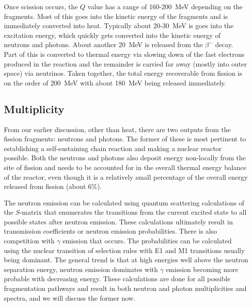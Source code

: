 Once scission occurs, the $Q$ value has a range of 160-200~MeV depending on the fragments. Most of this goes into the kinetic energy of the fragments and is immediately converted into heat. Typically about 20-30~MeV is goes into the excitation energy, which quickly gets converted into the kinetic energy of neutrons and photons. About another 20~MeV is released from the $\beta^-$ decay. Part of this is converted to thermal energy via slowing down of the fast electrons produced in the reaction and the remainder is carried far away (mostly into outer space) via neutrinos. Taken together, the total energy recoverable from fission is on the order of 200~MeV with about 180~MeV being released immediately.

\subsection{Multiplicity}

From our earlier discussion, other than heat, there are two outputs from the fission fragments: neutrons and photons. The former of these is most pertinent to establishing a self-sustaining chain reaction and making a nuclear reactor possible. Both the neutrons and photons also deposit energy non-locally from the site of fission and needs to be accounted for in the overall thermal energy balance of the reactor, even though it is a relatively small percentage of the overall energy released from fission (about 6\%).

The neutron emission can be calculated using quantum scattering calculations of the $S$-matrix that enumerates the transitions from the current excited state to all possible states after neutron emission. These calculations ultimately result in transmission coefficients or neutron emission probabilities. There is also competition with $\gamma$ emission that occurs. The probabilities can be calculated using the nuclear transition of selection rules with E1 and M1 transitions usually being dominant. The general trend is that at high energies well above the neutron separation energy, neutron emission dominates with $\gamma$ emission becoming more probable with decreasing energy. These calculations are done for all possible fragmentation pathways and result in both neutron and photon multiplicities and spectra, and we will discuss the former now.

